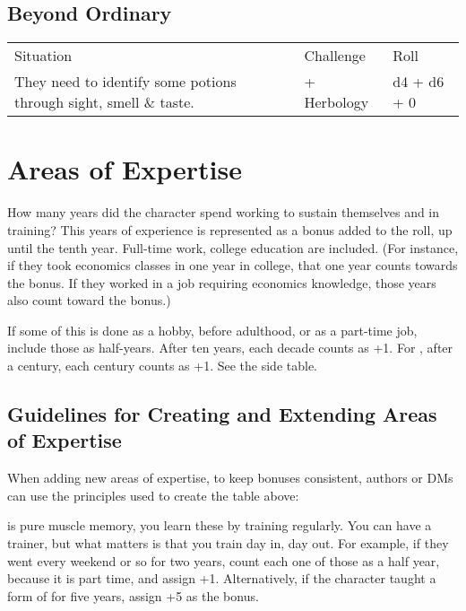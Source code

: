 \subsection*{Beyond Ordinary}

\begin{center}
	\begin{xltabular}{\textwidth}{Xll}
		Situation												& Challenge 								& Roll \\
		They need to identify some potions through sight, smell \& taste. 				&  + Herbology		& d4 + d6 + 0 \\
	\end{xltabular}
\end{center}





\section{Areas of Expertise}

\label{subsec:areas_of_expertise}

How many years did the character spend working to sustain themselves and in training?
This years of experience is represented as a bonus added to the roll, up until the tenth year.
Full-time work, college education are included.
(For instance, if they took economics classes in one year in college, that one year counts towards the bonus.
If they worked in a job requiring economics knowledge, those years also count toward the bonus.)

If some of this is done as a hobby, before adulthood, or as a part-time job, include those as half-years.
After ten years, each decade counts as +1. For ,
after a century, each century counts as +1. See the side table.

\subsection{Guidelines for Creating and Extending Areas of Expertise}

When adding new areas of expertise, to keep bonuses consistent,
authors or DMs can use the principles used to create the table above:

 is pure muscle memory, you learn these by training regularly.
You can have a trainer, but what matters is that you train day in, day out.
For example, if they went  every weekend or so for two years, count each one of those as a half year, because it is part time, and assign +1.
Alternatively, if the character taught a form of  for five years, assign +5 as the bonus.\par

